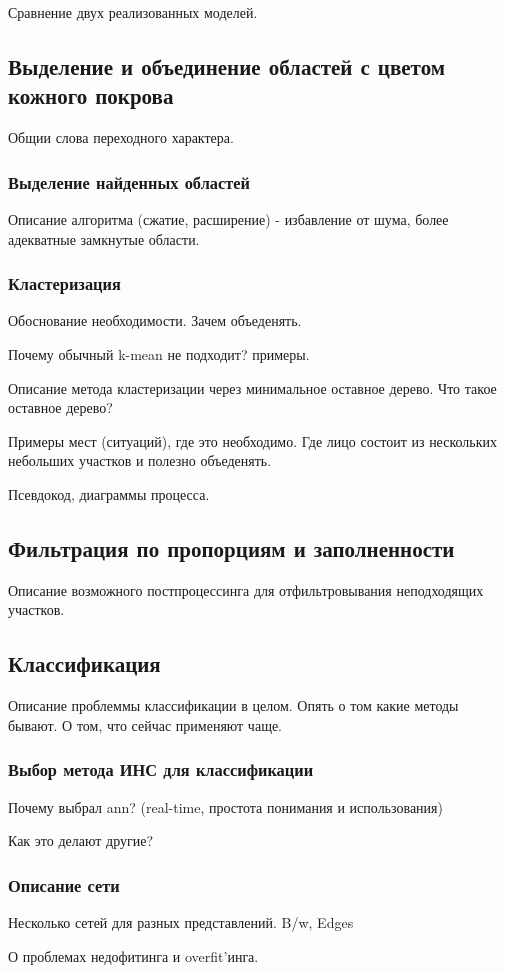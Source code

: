 \documentclass[12pt]{report}
\begin{document}
Сравнение двух реализованных моделей.

\subsection{Выделение и объединение областей с цветом кожного покрова}
Общии слова переходного характера. 
\subsubsection{Выделение найденных областей}
Описание алгоритма (сжатие, расширение) -  избавление от шума, более адекватные замкнутые области.
\subsubsection{Кластеризация}
Обоснование необходимости. Зачем объеденять.	

Почему обычный k-mean не подходит? примеры.

Описание метода кластеризации через минимальное оставное дерево. Что такое оставное дерево?

Примеры мест (ситуаций), где это необходимо. Где лицо состоит из нескольких небольших участков и полезно объеденять.

Псевдокод, диаграммы процесса.
\subsection{Фильтрация по пропорциям и заполненности}
Описание возможного постпроцессинга для отфильтровывания неподходящих участков.
\subsection{Классификация}
Описание проблеммы классификации в целом.
Опять о том какие методы бывают. О том, что сейчас применяют чаще.
\subsubsection{Выбор метода ИНС для классификации}
Почему выбрал ann? (real-time, простота понимания и использования)

Как это делают другие?
\subsubsection{Описание сети}
Несколько сетей для разных представлений. B/w, Edges

О проблемах недофитинга и overfit'инга.
\end{document}
